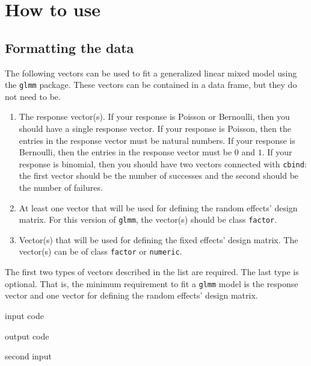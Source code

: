 \documentclass[article]{jss}
\begin{document}
\section[How to use glmm]{How to use }\label{sec:howto}


\subsection{Formatting the data}

The following vectors can be used to fit a generalized linear mixed model using the \texttt{glmm} package. These vectors can be contained in a data frame, but they do not need to be.
\begin{enumerate}
\item The response vector(s). If your response is Poisson or Bernoulli, then you should have a single response vector. If your response is Poisson, then the entries in the response vector must be natural numbers. If your response is Bernoulli, then the entries in the response vector must be $0$ and $1$. If your response is binomial, then you should have two vectors connected with \texttt{cbind}: the first vector should be the number of successes and the second should be the number of failures.
\item At least one vector that will be used for defining the random effects' design matrix. For this version of \texttt{glmm}, the vector(s) should be class \texttt{factor}.
\item Vector(s) that will be used for defining the fixed effects' design matrix. The vector(s) can be of class \texttt{factor} or \texttt{numeric}. 
\end{enumerate}
The first two types of vectors described in the list are required. The last type is optional. That is, the minimum requirement to fit a \texttt{glmm} model is the response vector and one vector for defining the random effects' design matrix. \\









\begin{CodeChunk}
\begin{CodeInput}
input code
\end{CodeInput}
\begin{CodeOutput}
output code
\end{CodeOutput}
\begin{CodeInput}
second input
\end{CodeInput}
\end{CodeChunk}
\end{document}

